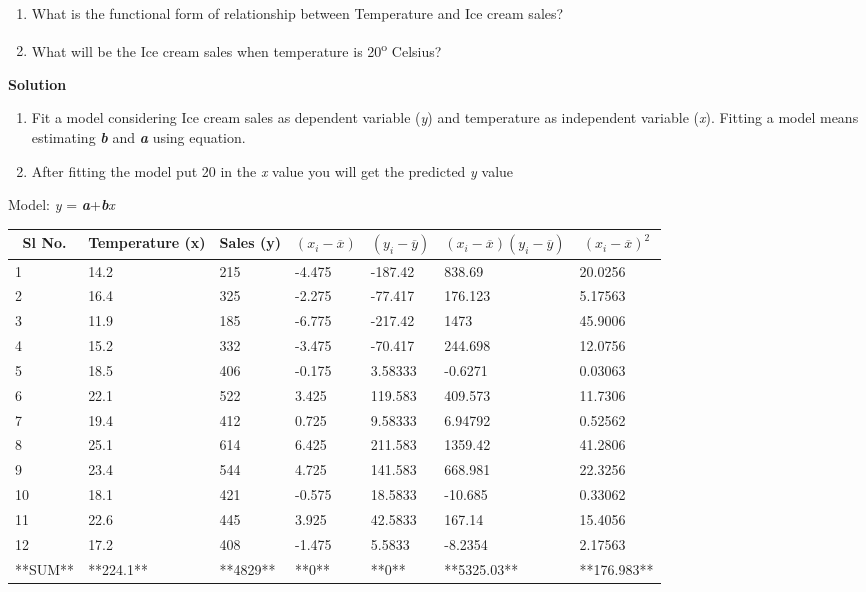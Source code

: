 \documentclass[
]{book}
\begin{document}
\begin{enumerate}
\def\labelenumi{\arabic{enumi}.}
\item
  What is the functional form of relationship between Temperature and
  Ice cream sales?
\item
  What will be the Ice cream sales when temperature is 20\textsuperscript{o} Celsius?
\end{enumerate}

\textbf{Solution}

\begin{enumerate}
\def\labelenumi{\arabic{enumi}.}
\item
  Fit a model considering Ice cream sales as dependent variable (\emph{y})
  and temperature as independent variable (\emph{x}). Fitting a model means
  estimating \textbf{\emph{b}} and \textbf{\emph{a}} using equation.
\item
  After fitting the model put 20 in the \emph{x} value you will get the
  predicted \emph{y} value
\end{enumerate}

Model: \emph{y} = \textbf{\emph{a}}+\emph{\textbf{b}x}

\begin{table}
\centering\centering
\begin{tabular}{l|l|l|l|l|l|l}
\hline
\multicolumn{1}{c}{\textbf{Sl No.}} & \multicolumn{1}{c}{\textbf{Temperature (x)}} & \multicolumn{1}{c}{\textbf{Sales (y)}} & \multicolumn{1}{c}{\textbf{$(x_{i}-\overline{x})$}} & \multicolumn{1}{c}{\textbf{$(y_{i}-\overline{y})$ }} & \multicolumn{1}{c}{\textbf{$(x_{i}-\overline{x})(y_{i}-\overline{y})$}} & \multicolumn{1}{c}{\textbf{$(x_{i}-\overline{x})^2$}}\\
\hline
1 & 14.2 & 215 & -4.475 & -187.42 & 838.69 & 20.0256\\
\hline
2 & 16.4 & 325 & -2.275 & -77.417 & 176.123 & 5.17563\\
\hline
3 & 11.9 & 185 & -6.775 & -217.42 & 1473 & 45.9006\\
\hline
4 & 15.2 & 332 & -3.475 & -70.417 & 244.698 & 12.0756\\
\hline
5 & 18.5 & 406 & -0.175 & 3.58333 & -0.6271 & 0.03063\\
\hline
6 & 22.1 & 522 & 3.425 & 119.583 & 409.573 & 11.7306\\
\hline
7 & 19.4 & 412 & 0.725 & 9.58333 & 6.94792 & 0.52562\\
\hline
8 & 25.1 & 614 & 6.425 & 211.583 & 1359.42 & 41.2806\\
\hline
9 & 23.4 & 544 & 4.725 & 141.583 & 668.981 & 22.3256\\
\hline
10 & 18.1 & 421 & -0.575 & 18.5833 & -10.685 & 0.33062\\
\hline
11 & 22.6 & 445 & 3.925 & 42.5833 & 167.14 & 15.4056\\
\hline
12 & 17.2 & 408 & -1.475 & 5.5833 & -8.2354 & 2.17563\\
\hline
**SUM** & **224.1** & **4829** & **0** & **0** & **5325.03** & **176.983**\\
\hline
\end{tabular}
\end{table}
\end{document}
